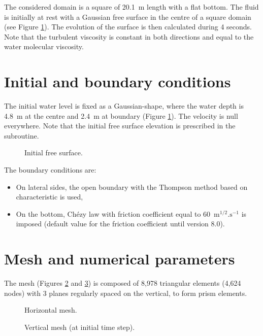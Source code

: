 \bigskip
The considered domain is a square of 20.1~m length with a flat bottom. 
The fluid is initially at rest with a Gaussian free surface in the 
centre of a square domain (see Figure \ref{t3d:thomson:fig:initial}).
The evolution of the surface is then calculated during 4 seconds.\\
Note that the turbulent viscosity is constant in both directions 
and equal to the water molecular viscosity.

\section{Initial and boundary conditions}
\bigskip
The initial water level is fixed as a Gaussian-shape, where the water depth 
is 4.8~m at the centre and 2.4~m at boundary 
(Figure \ref{t3d:thomson:fig:initial}). The velocity is null everywhere.
Note that the initial free surface elevation is prescribed in 
the  subroutine.

\begin{figure}[!htbp]
 \centering
\caption{Initial free surface.}
 \label{t3d:thomson:fig:initial}
\end{figure}

\bigskip
The boundary conditions are:
\begin{itemize}
\item On lateral sides, the open boundary with the Thompson method 
based on characteristic is used,
\item On the bottom, Chézy law with friction coefficient equal to 
60~$\text{m}^{1/2}.\text{s}^{-1}$ is imposed (default value
for the friction coefficient until version 8.0).
\end{itemize}

%
\section{Mesh and numerical parameters}
%
\bigskip
The mesh (Figures \ref{t3d:thomson:fig:meshH} and \ref{t3d:thomson:fig:meshV})  
is composed of 8,978 triangular elements (4,624 nodes) with 3 planes  
regularly spaced on the vertical, to form prism elements.

\begin{figure}[!htbp]
 \centering
 \caption{Horizontal mesh.}
 \label{t3d:thomson:fig:meshH}
\end{figure}
\begin{figure}[!htbp]
 \centering
 \caption{Vertical mesh (at initial time step).}
 \label{t3d:thomson:fig:meshV}
\end{figure}

